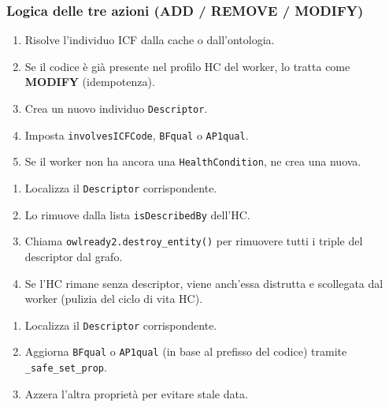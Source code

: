 \documentclass[a4paper,12pt]{article}
\renewcommand{\paragraph}[1]{%
  \par\vspace{4pt}%
  \noindent{\bfseries #1}\par\vspace{2pt}%
  \noindent\ignorespaces
}
\begin{document}
\subsubsection{Logica delle tre azioni (ADD / REMOVE / MODIFY)}

\paragraph{ADD}
\begin{enumerate}[noitemsep]
  \item Risolve l'individuo ICF dalla cache o dall'ontologia.
  \item Se il codice \`{e} gi\`{a} presente nel profilo HC del worker,
        lo tratta come \textbf{MODIFY} (idempotenza).
  \item Crea un nuovo individuo \texttt{Descriptor}.
  \item Imposta \texttt{involvesICFCode}, \texttt{BFqual} o \texttt{AP1qual}.
  \item Se il worker non ha ancora una \texttt{HealthCondition}, ne crea una nuova.
\end{enumerate}

\paragraph{REMOVE}
\begin{enumerate}[noitemsep]
  \item Localizza il \texttt{Descriptor} corrispondente.
  \item Lo rimuove dalla lista \texttt{isDescribedBy} dell'HC.
  \item Chiama \texttt{owlready2.destroy\_entity()} per rimuovere tutti i
        triple del descriptor dal grafo.
  \item Se l'HC rimane senza descriptor, viene anch'essa distrutta
        e scollegata dal worker (pulizia del ciclo di vita HC).
\end{enumerate}

\paragraph{MODIFY}
\begin{enumerate}[noitemsep]
  \item Localizza il \texttt{Descriptor} corrispondente.
  \item Aggiorna \texttt{BFqual} o \texttt{AP1qual} (in base al prefisso del codice)
        tramite \texttt{\_safe\_set\_prop}.
  \item Azzera l'altra propriet\`{a} per evitare stale data.
\end{enumerate}
\end{document}
